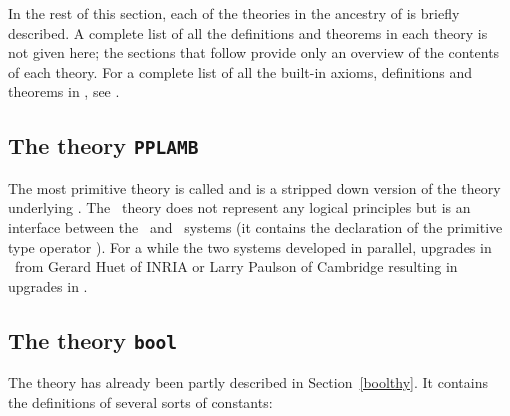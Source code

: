 {{\begin{center}
\begin{picture}
\end{picture}
\end{center}

\noindent In the rest of this section, each of the theories in  the ancestry of
 is  briefly described.   A  complete list  of all  the definitions and
theorems in each theory is  not given  here; the sections  that follow provide
only an overview of the contents of each theory.  For a complete list of
all the built-in axioms, definitions and theorems in \HOL, see \REFERENCE.

\subsection{The theory {\tt PPLAMB}}

The most primitive theory is called  and is a stripped down
version of the theory underlying \LCF.  The \HOL\ theory 
does not represent any logical principles but is an interface between the \HOL\
and \LCF\ systems (it contains the declaration of the primitive 
type operator \ml{->}).
For a while the two systems developed in parallel, upgrades in \LCF\ from
Gerard Huet\index{Huet, G.} of {\small INRIA} or Larry Paulson of Cambridge resulting in
upgrades in \HOL.

\subsection{The theory {\tt bool}}\label{boolfull}

The theory  has already been partly described in 
Section~\ref{boolthy}.
It contains the definitions of several sorts of constants:

\begin{myenumerate}



\end{myenumerate}}}
